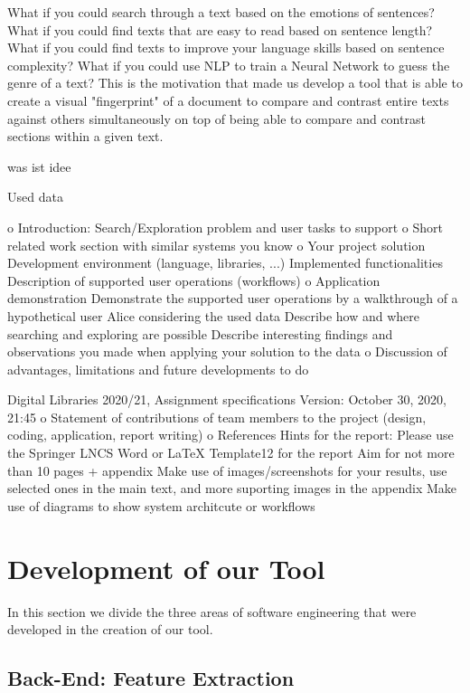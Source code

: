 \documentclass[runningheads]{llncs}
\begin{document}
What if you could search through a text based on the emotions of sentences? What if you could find texts that are easy to read based on sentence length? What if you could find texts to improve your language skills based on sentence complexity? What if you could use NLP to train a Neural Network to guess the genre of a text? This is the motivation that made us develop a tool that is able to create a visual "fingerprint" of a document to compare and contrast entire texts against others simultaneously on top of being able to compare and contrast sections within a given text.



was ist idee


Used data

o Introduction: Search/Exploration problem and user tasks to support o Short related work section with similar systems you know
o Your project solution
Development environment (language, libraries, ...) Implemented functionalities
Description of supported user operations (workflows)
o Application demonstration
Demonstrate the supported user operations by a walkthrough of a hypothetical
user Alice considering the used data
Describe how and where searching and exploring are possible
Describe interesting findings and observations you made when applying your solution to the data
o Discussion of advantages, limitations and future developments to do
           
Digital Libraries 2020/21, Assignment specifications Version: October 30, 2020, 21:45
 o Statement of contributions of team members to the project (design, coding, application, report writing)
o References Hints for the report:
Please use the Springer LNCS Word or LaTeX Template12 for the report Aim for not more than 10 pages + appendix
Make use of images/screenshots for your results, use selected ones in the main text, and more suporting images in the appendix
Make use of diagrams to show system architcute or workflows



\newpage
\section{Development of our Tool}
In this section we divide the three areas of software engineering that were developed in the creation of our tool. 

\subsection{Back-End: Feature Extraction}
\end{document}
